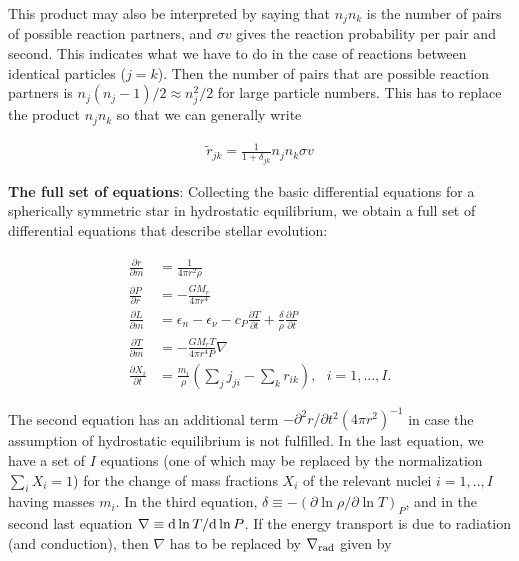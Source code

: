 \documentclass[a4paper,10pt]{article}
\begin{document}
{\noindent}This product may also be interpreted by saying that $n_jn_k$ is the number of pairs of possible reaction partners, and $\sigma v$ gives the reaction probability per pair and second. This indicates what we have to do in the case of reactions between identical particles ($j=k$). Then the number of pairs that are possible reaction partners is $n_j(n_j-1)/2\approx n_j^2/2$ for large particle numbers. This has to replace the product $n_jn_k$ so that we can generally write

\begin{align*}
    \tilde{r}_{jk} = \frac{1}{1+\delta_{jk}}n_jn_k\sigma v
\end{align*}

{\noindent}\textbf{The full set of equations}: Collecting the basic differential equations for a spherically symmetric star in hydrostatic equilibrium, we obtain a full set of differential equations that describe stellar evolution:

\begin{equation*}
\boxed{
    \begin{aligned}
        \frac{\partial r}{\partial m} &= \frac{1}{4\pi r^2\rho} \\
        \frac{\partial P}{\partial r} &= -\frac{GM_r}{4\pi r^4} \\
        \frac{\partial L}{\partial m} &= \epsilon_n-\epsilon_\nu-c_P \frac{\partial T}{\partial t} + \frac{\delta}{\rho}\frac{\partial P}{\partial t} \\
        \frac{\partial T}{\partial m} &= -\frac{GM_rT}{4\pi r^4P}\nabla \\
        \frac{\partial X_i}{\partial t} &= \frac{m_i}{\rho} \left(\sum_jj_{ji} - \sum_kr_{ik}\right), ~~~ i=1,...,I.
    \end{aligned}
}
\end{equation*}

{\noindent}The second equation has an additional term $-\partial^2r/\partial t^2(4\pi r^2)^{-1}$ in case the assumption of hydrostatic equilibrium is not fulfilled. In the last equation, we have a set of $I$ equations (one of which may be replaced by the normalization $\sum_iX_i=1$) for the change of mass fractions $X_i$ of the relevant nuclei $i=1,..,I$ having masses $m_i$. In the third equation, $\delta\equiv-(\partial\ln\rho/\partial\ln T)_P$, and in the second last equation $\nabla\equiv{\rm d}\ln T/{\rm d}\ln P$. If the energy transport is due to radiation (and conduction), then $\nabla$ has to be replaced by $\nabla_{\rm rad}$ given by 
\end{document}
